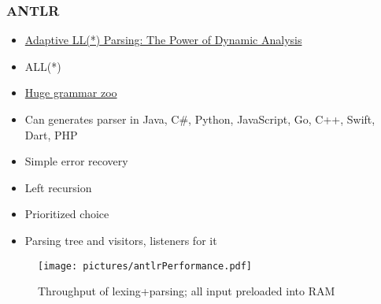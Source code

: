\documentclass[xcolor=table,aspectratio=169]{beamer}
\begin{document}
\begin{frame}[fragile]
  \frametitle{ANTLR}  
  \begin{minipage}[t]{0.48\textwidth}
  \begin{itemize}
    \item \href{https://www.antlr.org/papers/allstar-techreport.pdf}{Adaptive LL(*) Parsing: The Power of Dynamic Analysis}
    \item ALL(*)
    \item \href{https://github.com/antlr/grammars-v4}{Huge grammar zoo}
    \item Can generates parser in Java, C\#, Python, JavaScript, Go, C++, Swift, Dart, PHP
    \item[\faPlus] Simple error recovery
    \item[\faPlus] Left recursion
    \item[\faPlus] Prioritized choice
    \item[\faPlus] Parsing tree and visitors, listeners for it
  \end{itemize}
\end{minipage}
\begin{minipage}[t]{0.48\textwidth}
  \begin{figure}
    \texttt{[image: pictures/antlrPerformance.pdf]}
    \caption{Throughput of lexing+parsing; all input preloaded into RAM\footnotemark}
  \end{figure}
\end{minipage}
\end{frame}
\end{document}
